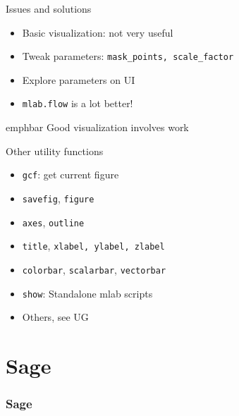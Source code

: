 \documentclass[14pt,compress]{beamer}
\newcommand{\emphbar}[1]
{\begin{beamercolorbox}[rounded=true]{emphbar} 
      {#1}
 \end{beamercolorbox}
}
\newcounter{time}
\newcommand{\inctime}[1]{\addtocounter{time}{#1}{\tiny \thetime\ m}}
\newcommand{\PythonCode}[1]{\lstinline{#1}}
\begin{document}
\begin{frame}[plain]
    {Issues and solutions}

    \Large 

    \begin{itemize}

        \item Basic visualization: not very useful

        \item Tweak parameters: \PythonCode{mask_points, scale_factor}

        \item Explore parameters on UI

        \item \PythonCode{mlab.flow} is a lot better!

    \end{itemize}

    \emphbar{\alert{Good} visualization involves work}
 
    \inctime{10}

\end{frame}

\begin{frame}[plain]
    {Other utility functions}
    \Large
    \begin{itemize}
        \item \PythonCode{gcf}: get current figure
            \pause
        \item \PythonCode{savefig}, \PythonCode{figure}
            \pause
        \item \PythonCode{axes}, \PythonCode{outline}
            \pause
        \item \PythonCode{title}, \PythonCode{xlabel, ylabel, zlabel}
            \pause
        \item \PythonCode{colorbar}, \PythonCode{scalarbar},
            \PythonCode{vectorbar}
            \pause
        \item \PythonCode{show}: Standalone mlab scripts
            \pause
        \item Others, see UG
    \end{itemize}

\end{frame}

\section{Sage}

\begin{frame}[plain]
    \frametitle{Sage}
  \begin{center}    
  \end{center}
\end{frame}
\end{document}
